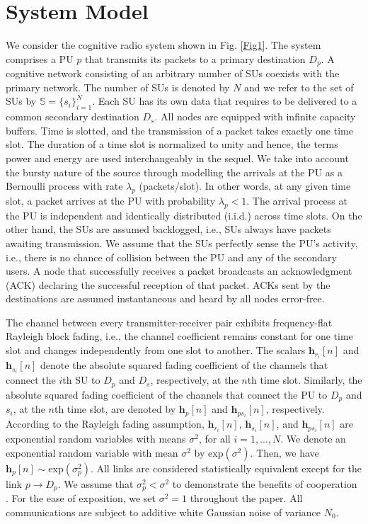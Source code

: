 \documentclass[journal,twocolumn]{IEEEtran}
\begin{document}
\section{System Model}\label{system_model}
We consider the cognitive radio system shown in Fig. \ref{Fig1}.
The system comprises a PU $p$ that transmits its packets to a primary destination $D_{p}$. A cognitive network consisting of an arbitrary number of SUs coexists with the primary network. The number of SUs is denoted by $N$ and we refer to the set of SUs by $\mathbb{S}=\{ s_{i} \}_{i=1}^{N}$. Each SU has its own data that requires to be delivered to a common secondary destination $D_{s}$. All nodes are equipped with infinite capacity buffers. Time is slotted, and the transmission of a packet takes exactly one time slot. The duration of a time slot is normalized to unity and hence, the terms power and energy are used interchangeably in the sequel. We take into account the bursty nature of the source through modelling the arrivals at the PU as a Bernoulli process with rate $\lambda_{p}$ (packets/slot). In other words, at any given time slot, a packet
arrives at the PU with probability $\lambda_{p}<1$. The arrival process at the PU is independent and identically distributed (i.i.d.) across time slots. On the other hand, the SUs are assumed backlogged, i.e., SUs always have packets awaiting transmission. We assume that the SUs perfectly sense the PU's activity, i.e., there is no chance of collision between the PU and any of the secondary users. A node that successfully receives a packet broadcasts an acknowledgment (ACK) declaring the successful reception of that packet. ACKs sent by the destinations are assumed instantaneous and heard by all nodes error-free.

The channel between every transmitter-receiver pair exhibits frequency-flat Rayleigh block fading, i.e., the channel coefficient remains constant for one time slot and changes independently from one slot to another. The scalars $\mathbf{h}_{r_{i}}[n]$ and $\mathbf{h}_{s_{i}}[n]$ denote the absolute squared fading coefficient of the channels that connect the $i$th SU to $D_{p}$ and $D_{s}$, respectively, at the $n$th time slot. Similarly, the absolute squared fading coefficient of the channels that connect the PU to $D_{p}$ and $s_{i}$, at the $n$th time slot, are denoted by $\mathbf{h}_{p}[n]$ and $\mathbf{h}_{ps_{i}}[n]$, respectively. According to the Rayleigh fading assumption, $\mathbf{h}_{r_{i}}[n]$, $\mathbf{h}_{s_{i}}[n]$, and $\mathbf{h}_{ps_{i}}[n]$ are exponential random variables with means $\sigma^{2}$, for all $i=1,\hdots,N$. We denote an exponential random variable with mean $\sigma^{2}$ by $\mathrm{exp}(\sigma^{2})$. Then, we have $\mathbf{h}_{p}[n] \sim \mathrm{exp}(\sigma_{p}^{2})$. All links are considered statistically equivalent except for the link $p \rightarrow D_{p}$. We assume that $\sigma_{p}^{2}<\sigma^{2}$ to demonstrate the benefits of cooperation \cite{sadek}. For the ease of exposition, we set $\sigma^{2}=1$ throughout the paper. All communications are subject to additive white Gaussian noise of variance $N_{0}$.
\end{document}

